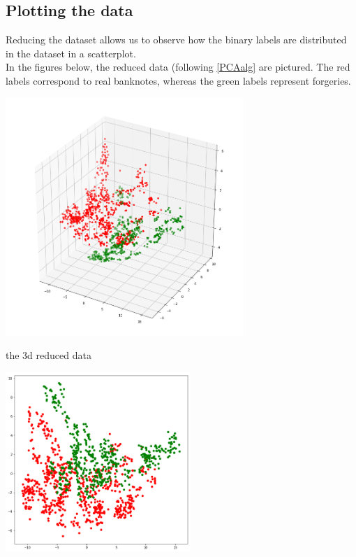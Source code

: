 \documentclass[14pt]{article}
\theoremstyle{plain}
\theoremstyle{definition}
\begin{document}
   
    
\subsection{Plotting the data} Reducing the dataset allows us to observe how the binary labels are distributed in the dataset in a scatterplot.\\ In the figures below, the reduced data (following \ref{PCAalg} are pictured. The red labels correspond to real banknotes, whereas the green labels represent forgeries.

\begin{table}[ht]
\begin{minipage}[b]{0.56\linewidth}
\centering
\includegraphics[width=90mm]{banknote_forgery_files/model_1}
 \caption{the 3d reduced data}
    \label{table:student}
\end{minipage}\hfill
\begin{minipage}[b]{0.4\linewidth}
\centering
\includegraphics[width=70mm]{banknote_forgery_files/model_2}
\vspace{0.29in}
\label{boxplot}
\end{minipage}
\end{table}
\end{document}
